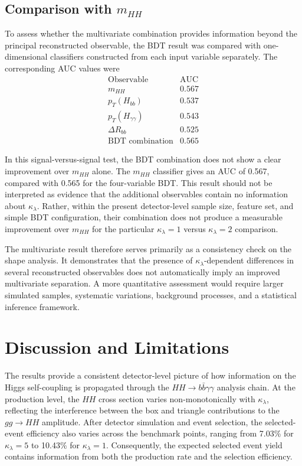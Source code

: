 \documentclass[11pt,a4paper]{article}
\begin{document}
\subsection{\texorpdfstring{Comparison with $m_{HH}$}{Comparison with mHH}}

To assess whether the multivariate combination provides information beyond the principal reconstructed observable, the BDT result was compared with one-dimensional classifiers constructed from each input variable separately. The corresponding AUC values were
\begin{equation}
\begin{array}{c|c}
\text{Observable} & \text{AUC} \\
\hline
m_{HH} & 0.567 \\
p_T(H_{bb}) & 0.537 \\
p_T(H_{\gamma\gamma}) & 0.543 \\
\Delta R_{bb} & 0.525 \\
\text{BDT combination} & 0.565
\end{array}
\end{equation}

In this signal-versus-signal test, the BDT combination does not show a clear improvement over $m_{HH}$ alone. The $m_{HH}$ classifier gives an AUC of 0.567, compared with 0.565 for the four-variable BDT. This result should not be interpreted as evidence that the additional observables contain no information about $\kappa_\lambda$. Rather, within the present detector-level sample size, feature set, and simple BDT configuration, their combination does not produce a measurable improvement over $m_{HH}$ for the particular $\kappa_\lambda=1$ versus $\kappa_\lambda=2$ comparison.

The multivariate result therefore serves primarily as a consistency check on the shape analysis. It demonstrates that the presence of $\kappa_\lambda$-dependent differences in several reconstructed observables does not automatically imply an improved multivariate separation. A more quantitative assessment would require larger simulated samples, systematic variations, background processes, and a statistical inference framework.

\section{Discussion and Limitations}

The results provide a consistent detector-level picture of how information on the Higgs self-coupling is propagated through the $HH\to b\bar b\gamma\gamma$ analysis chain. At the production level, the $HH$ cross section varies non-monotonically with $\kappa_\lambda$, reflecting the interference between the box and triangle contributions to the $gg\to HH$ amplitude. After detector simulation and event selection, the selected-event efficiency also varies across the benchmark points, ranging from 7.03\% for $\kappa_\lambda=5$ to 10.43\% for $\kappa_\lambda=1$. Consequently, the expected selected event yield contains information from both the production rate and the selection efficiency.
\end{document}
